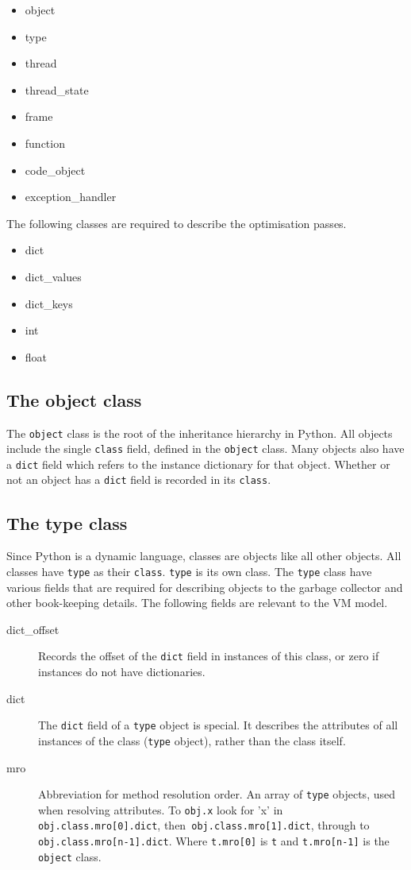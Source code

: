 \documentclass[a4paper,10pt]{article}
\newenvironment{myitemize}{
\begin{itemize}
  \setlength{\itemsep}{0pt}
  \setlength{\parskip}{0pt}
  \setlength{\parsep}{0pt}
}{\end{itemize}}
\begin{document}
\begin{myitemize}
\item object
\item type
\item thread
\item thread\_state
\item frame
\item function
\item code\_object
\item exception\_handler
\end{myitemize}

The following classes are required  to describe the optimisation passes.
\begin{myitemize}
\item dict
\item dict\_values
\item dict\_keys
\item int
\item float
\end{myitemize}

\subsection{The object class}
The \verb|object| class is the root of the inheritance hierarchy in Python. All objects include the single \verb|class| field,
defined in the \verb|object| class. Many objects also have a \verb|dict| field which refers to the instance dictionary for that object. Whether or not an object has a \verb|dict| field is recorded in its \verb|class|.

\subsection{The type class}
Since Python is a dynamic language, classes are objects like all other objects. All classes have \verb|type| as their \verb|class|. \verb|type| is its own class. The \verb|type| class have various fields that are required for describing objects to the garbage collector and other book-keeping details. The following fields are relevant to the VM model.
\begin{description}
\item[dict\_offset] Records the offset of the \verb|dict| field in instances of this class, or zero if instances do not have dictionaries.
\item[dict] The \verb|dict| field of a \verb|type| object is special.
It describes the attributes of all instances of the class (\verb|type| object), rather than the class itself.
\item[mro] Abbreviation for method resolution order. An array of \verb|type| objects, used when resolving attributes. To \verb|obj.x| look for 'x' in \verb|obj.class.mro[0].dict|, then\verb| obj.class.mro[1].dict|, through to \verb|obj.class.mro[n-1].dict|. Where \verb|t.mro[0]| is \verb|t| and \verb|t.mro[n-1]| is the \verb|object| class.
\end{description}
\end{document}
